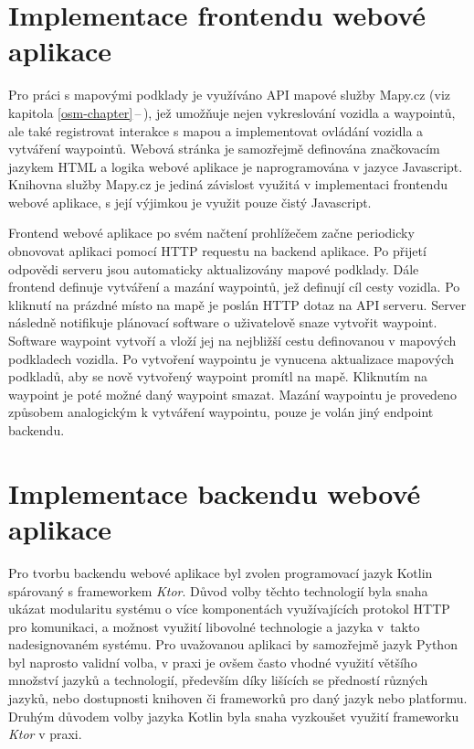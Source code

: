 \documentclass[czech, bachelor]{diploma}
\newcommand{\peteref}[1]{\ref{#1}\,--\,\nameref{#1}}
\begin{document}
\section{Implementace frontendu webové aplikace}

Pro práci s mapovými podklady je využíváno API mapové služby Mapy.cz (viz kapitola \peteref{osm-chapter}), jež umožňuje nejen
vykreslování vozidla a waypointů, ale také registrovat interakce s mapou a implementovat ovládání vozidla a vytváření waypointů.
Webová stránka je samozřejmě definována značkovacím jazykem HTML a logika webové aplikace je naprogramována v jazyce Javascript.
Knihovna služby Mapy.cz je jediná závislost využitá v implementaci frontendu webové aplikace, s její výjimkou je využit pouze
čistý Javascript.

Frontend webové aplikace po svém načtení prohlížečem začne periodicky obnovovat aplikaci pomocí HTTP requestu na backend aplikace.
Po přijetí odpovědi serveru jsou automaticky aktualizovány mapové podklady. Dále frontend definuje vytváření a mazání waypointů,
jež definují cíl cesty vozidla. Po kliknutí na prázdné místo na mapě je poslán HTTP dotaz na API serveru. Server následně
notifikuje plánovací software o uživatelově snaze vytvořit waypoint. Software waypoint vytvoří a vloží jej na nejbližší cestu
definovanou v mapových podkladech vozidla. Po vytvoření waypointu je vynucena aktualizace mapových podkladů, aby se nově vytvořený
waypoint promítl na mapě. Kliknutím na waypoint je poté možné daný waypoint smazat. Mazání waypointu je provedeno způsobem
analogickým k vytváření waypointu, pouze je volán jiný endpoint backendu.

\section{Implementace backendu webové aplikace}

Pro tvorbu backendu webové aplikace byl zvolen programovací jazyk Kotlin spárovaný s frameworkem \emph{Ktor}. Důvod volby těchto
technologií byla snaha ukázat modularitu systému o více komponentách využívajících protokol HTTP pro komunikaci, a možnost využití
libovolné technologie a jazyka v~takto nadesignovaném systému. Pro uvažovanou aplikaci by samozřejmě jazyk Python byl naprosto
validní volba, v praxi je ovšem často vhodné využití většího množství jazyků a technologií, především díky lišících se předností
různých jazyků, nebo dostupnosti knihoven či frameworků pro daný jazyk nebo platformu. Druhým důvodem volby jazyka Kotlin byla
snaha vyzkoušet využití frameworku \emph{Ktor} v praxi.
\end{document}
